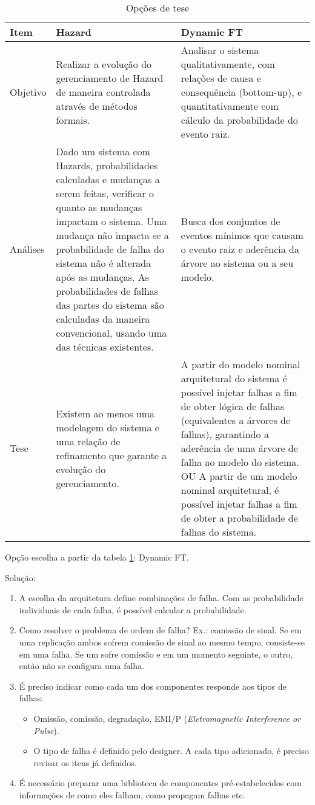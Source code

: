 
\begin{table}
\begin{center}
\begin{tabular}{l|p{6.5cm}|p{6.5cm}}
Item & Hazard & Dynamic FT\\
\hline
\hline
Objetivo 
  & Realizar a evolução do gerenciamento de Hazard de maneira controlada através de métodos formais. 
  & Analisar o sistema qualitativamente, com relações de causa e consequência (bottom-up), e quantitativamente com cálculo da probabilidade do evento raiz.\\
\hline
Análises 
  & Dado um sistema com Hazards, probabilidades calculadas e mudanças a serem feitas, verificar o quanto as mudanças impactam o sistema. Uma mudança não impacta se a probabilidade de falha do sistema não é alterada após as mudanças. As probabilidades de falhas das partes do sistema são calculadas da maneira convencional, usando uma das técnicas existentes. 
  & Busca dos conjuntos de eventos mínimos que causam o evento raiz e aderência da árvore ao sistema ou a seu modelo. \\
\hline
Tese 
  & Existem ao menos uma modelagem do sistema e uma relação de refinamento que garante a evolução do gerenciamento. 
  & A partir do modelo nominal arquitetural do sistema é possível injetar falhas a fim de obter lógica de falhas (equivalentes a árvores de falhas), garantindo a aderência de uma árvore de falha ao modelo do sistema. OU A partir de um modelo nominal arquitetural, é possível injetar falhas a fim de obter a probabilidade de falhas do sistema.\\
\hline
\end{tabular}
\end{center}
\caption{Opções de tese}
\label{tbl:thesis-decision}
\end{table}

Opção escolha a partir da tabela \cref{tbl:thesis-decision}: Dynamic FT.

Solução:
\begin{enumerate}
  \item A escolha da arquitetura define combinações de falha. Com as probabilidade individuais de cada falha, é possível calcular a probabilidade. 
  \item Como resolver o problema de ordem de falha? Ex.: comissão de sinal. Se em uma replicação ambos sofrem comissão de sinal ao mesmo tempo, consiste-se em uma falha. Se um sofre comissão e em um momento seguinte, o outro, então não se configura uma falha.
  \item É preciso indicar como cada um dos componentes responde aos tipos de falhas:
  \begin{itemize}
    \item Omissão, comissão, degradação, EMI/P (\emph{Eletromagnetic Interference or Pulse}).
    \item O tipo de falha é definido pelo designer. A cada tipo adicionado, é preciso revisar os itens já definidos.
  \end{itemize}
  \item É necessário preparar uma biblioteca de componentes pré-estabelecidos com informações de como eles falham, como propagam falhas etc.
\end{enumerate}